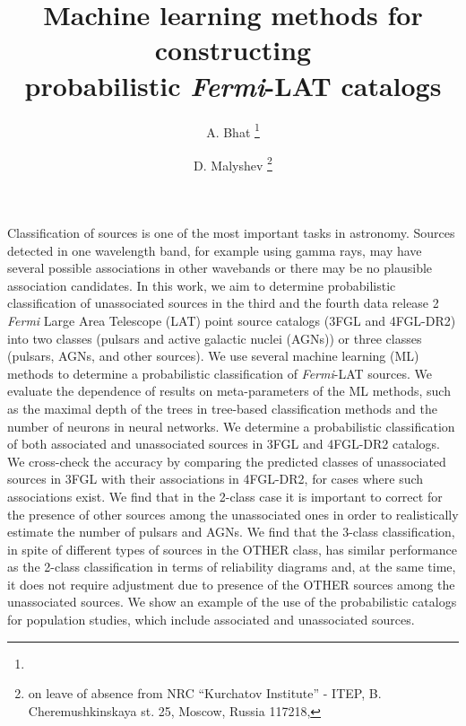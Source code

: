 \documentclass{aa}
\newcommand{\Fermi}{\textit{Fermi}\xspace}
\begin{document}
 



   \title{Machine learning methods for constructing \\ probabilistic \Fermi-LAT catalogs}



   \author{A. Bhat \thanks{}
          \and
          D. Malyshev \thanks{on leave of absence from NRC ``Kurchatov Institute'' - ITEP, B. Cheremushkinskaya st. 25, Moscow, Russia 117218, 
          }
          }




 
\abstract
{
Classification of sources is one of the most important tasks in astronomy.
Sources detected in one wavelength band, for example using gamma rays, may have several possible associations in other wavebands or
there may be no plausible association candidates.
}
{
In this work, we aim to determine probabilistic classification of unassociated sources in the third and the fourth data release 2 \Fermi Large Area Telescope (LAT) point source catalogs (3FGL and 4FGL-DR2) into two classes (pulsars and active galactic nuclei (AGNs)) or three classes (pulsars, AGNs, and other sources).
}
{
We use several machine learning (ML) methods to determine a probabilistic classification of \Fermi-LAT sources.
We evaluate the dependence of results on meta-parameters of the ML methods, such as the maximal depth of the trees in tree-based classification methods and the number of neurons in neural networks.
}
{
We determine a probabilistic classification of both associated and unassociated sources in 3FGL and 4FGL-DR2 catalogs.
We cross-check the accuracy by comparing the predicted classes of unassociated sources in 3FGL with their associations in 4FGL-DR2, for cases where such associations exist.
We find that in the 2-class case it is important to correct for the presence of other sources among the unassociated ones in order to realistically estimate the number of pulsars and AGNs.
We find that the 3-class classification, in spite of different types of sources in the OTHER class, has similar performance as the 2-class classification in terms of reliability diagrams and, at the same time, it does not require adjustment due to presence of the OTHER sources among the unassociated sources.
We show an example of the use of the probabilistic catalogs for population studies, which include associated and 
unassociated sources.
}
{}
\end{document}
